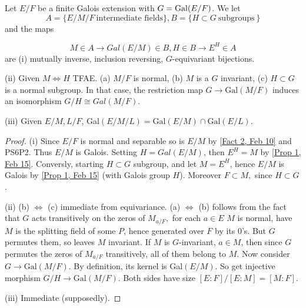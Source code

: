 \begin{thm} \label{Thm 2, Feb 17}
Let $E / F$ be a finite Galois extension with $G= \operatorname{Gal}(E/F)$. We let
$$A=\{E/M/F\ \text{intermediate fields}\}, B=\{H\subset G\ \text{subgroups}\ \}$$ and the maps

$$M\in A\longrightarrow Gal(E/M)\in B, H\in B\longrightarrow E^H\in A$$ are  (i) mutually inverse, inclusion reversing, $G$-equivariant bijections.

(ii) Given $M\iff H$ TFAE.
(a) $M/F$ is normal,
(b) $M$ is a $G$ invariant,
(c) $H\subset G$ is a normal subgroup.
In that case, the restriction map $G\longrightarrow \text{Gal}(M/F)$ induces an isomorphism $G/H\cong Gal(M/F)$.

(iii) Given $E/M,L/F$, Gal$(E/M/L)=\text{Gal}(E/M)\cap \text{Gal}(E/L)$.
\end{thm}
\begin{proof}
(i) Since $E/F$ is normal and separable so is $E/M$ by \ref{Fact 2, Feb 10} and PS6P2. Thus $E/M$ is Galois. Setting $H=Gal(E/M)$, then $E^H=M$ by \ref{Prop 1, Feb 15}. Conversly, starting $H\subset G$ subgroup, and let $M=E^H$, hence $E/M$ is Galois by \ref{Prop 1, Feb 15} (with Galois group $H$). Moreover $F\subset M,$ since $H\subset G$.

(ii) (b) $\iff$ (c) immediate from equivariance. (a) $\iff$ (b) follows from the fact that $G$ acts transitively on the zeros of $M_{a/F},$ for each $a\in E$ $M$ is normal, have $M$ is the splitting field of some $P$, hence generated over $F$ by its 0's. But $G$ permutes them, so leaves $M$ invariant. If $M$ is $G$-invariant, $a\in M$, then since $G$ permutes the zeros of $M_{a/F}$ transitively, all of them belong to $M$. Now consider $G\longrightarrow \text{Gal}(M/F)$. By definition, its kernel is Gal$(E/M)$. So get injective morphism $G/H\longrightarrow \text{Gal}(M/F)$. Both sides have size $[E:F]/[E:M]=[M:F]$.

(iii) Immediate (supposedly).
\end{proof}
